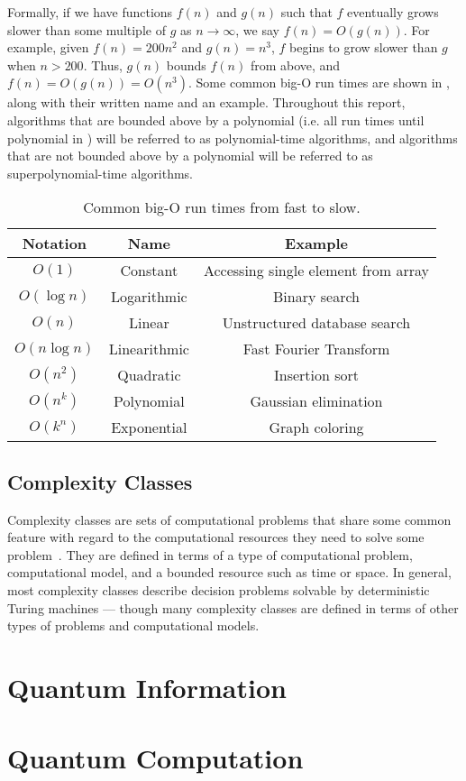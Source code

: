 Formally, if we have functions $f(n)$ and $g(n)$ such that $f$ eventually grows slower than some multiple of $g$ as $n \to \infty$, we say $f(n) = O(g(n))$.
For example, given $f(n) = 200n^2$ and $g(n) = n^3$, $f$ begins to grow slower than $g$ when $n > 200$.
Thus, $g(n)$ bounds $f(n)$ from above, and $f(n) = O(g(n)) = O(n^3)$.
Some common big-O run times are shown in , along with their written name and an example.
Throughout this report, algorithms that are bounded above by a polynomial (i.e. all run times until polynomial in ) will be referred to as polynomial-time algorithms, and algorithms that are not bounded above by a polynomial will be referred to as superpolynomial-time algorithms.

\begin{table}[ht]
    \centering
    {\renewcommand{\arraystretch}{1.1}
    \begin{tabular}{ c|c|c }
        Notation & Name & Example \\
        \hline
        $O(1)$ & Constant & Accessing single element from array \\
        $O(\log n)$ & Logarithmic & Binary search \\
        $O(n)$ & Linear & Unstructured database search \\
        $O(n \log n)$ & Linearithmic & Fast Fourier Transform \\
        $O(n^2)$ & Quadratic & Insertion sort \\
        $O(n^k)$ & Polynomial & Gaussian elimination \\
        $O(k^n)$ & Exponential & Graph coloring \\
    \end{tabular}
    }
    \caption{Common big-O run times from fast to slow.}
    \label{table:common-big-o}
\end{table}

\subsection{Complexity Classes}
Complexity classes are sets of computational problems that share some common feature with regard to the computational resources they need to solve some problem~\cite{arora2009computational}.
They are defined in terms of a type of computational problem, computational model, and a bounded resource such as time or space.
In general, most complexity classes describe decision problems solvable by deterministic Turing machines --- though many complexity classes are defined in terms of other types of problems and computational models.
\section{Quantum Information}

\section{Quantum Computation}